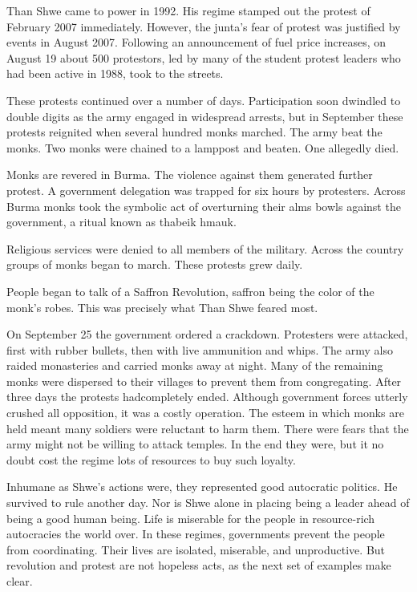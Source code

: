 \documentclass[10pt]{article}
\begin{document}
{\large Than Shwe came to power in 1992. His regime stamped out the protest of
February 2007 immediately. However, the junta's fear of protest was justified by
events in August 2007. Following an announcement of fuel price increases, on
August 19 about 500 protestors, led by many of the student protest leaders who
had been active in 1988, took to the streets.}

{\large These protests continued over a number of days. Participation soon
dwindled to double digits as the army engaged in widespread arrests, but in
September these protests reignited when several hundred monks marched. The army
beat the monks. Two monks were chained to a lamppost and beaten. One allegedly
died.}

{\large Monks are revered in Burma. The violence against them generated further
protest. A government delegation was trapped for six hours by protesters. Across
Burma monks took the symbolic act of overturning their alms bowls against the
government, a ritual known as thabeik hmauk.}

{\large Religious services were denied to all members of the military. Across
the country groups of monks began to march. These protests grew daily.}

{\large People began to talk of a Saffron Revolution, saffron being the color of
the monk's robes. This was precisely what Than Shwe feared most.}

{\large On September 25 the government ordered a crackdown. Protesters were
attacked, first with rubber bullets, then with live ammunition and whips. The
army also raided monasteries and carried monks away at night. Many of the
remaining monks were dispersed to their villages to prevent them from
congregating. After three days the protests hadcompletely ended. Although
government forces utterly crushed all opposition, it was a costly operation. The
esteem in which monks are held meant many soldiers were reluctant to harm them.
There were fears that the army might not be willing to attack temples. In the end
they were, but it no doubt cost the regime lots of resources to buy such
loyalty.}

{\large Inhumane as Shwe's actions were, they represented good autocratic
politics. He survived to rule another day. Nor is Shwe alone in placing being a
leader ahead of being a good human being. Life is miserable for the people in
resource-rich autocracies the world over. In these regimes, governments prevent
the people from coordinating. Their lives are isolated, miserable, and
unproductive. But revolution and protest are not hopeless acts, as the next set
of examples make clear.}
\end{document}
